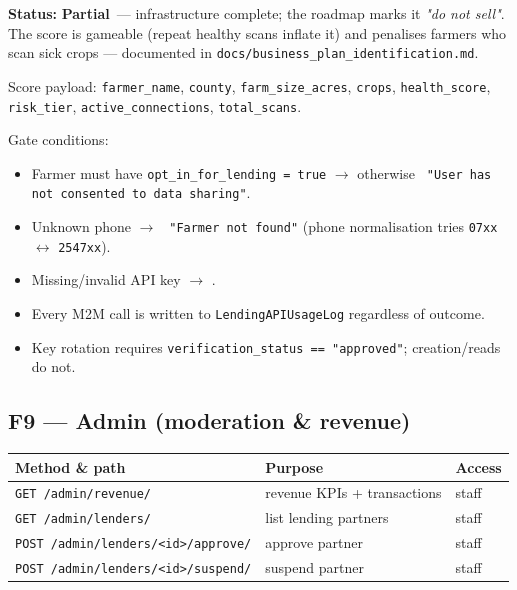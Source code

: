\documentclass[11pt,a4paper]{article}
\newcommand{\partialstatus}{\textcolor{statuspart}{\textbf{Partial}}}
\newcommand{\code}[1]{\texttt{\allowbreak #1\allowbreak}}
\begin{document}
\textbf{Status:} \partialstatus\ --- infrastructure complete; the roadmap
marks it \emph{"do not sell"}. The score is gameable (repeat healthy scans
inflate it) and penalises farmers who scan sick crops --- documented in
\code{docs/business\_plan\_identification.md}.

Score payload: \code{farmer\_name}, \code{county}, \code{farm\_size\_acres},
\code{crops}, \code{health\_score}, \code{risk\_tier},
\code{active\_connections}, \code{total\_scans}.

Gate conditions:
\begin{itemize}
  \item Farmer must have \code{opt\_in\_for\_lending = true} $\rightarrow$
        otherwise \code{403 "User has not consented to data sharing"}.
  \item Unknown phone $\rightarrow$ \code{404 "Farmer not found"}
        (phone normalisation tries \code{07xx} $\leftrightarrow$ \code{2547xx}).
  \item Missing/invalid API key $\rightarrow$ \code{401}.
  \item Every M2M call is written to \code{LendingAPIUsageLog} regardless
        of outcome.
  \item Key rotation requires \code{verification\_status == "approved"};
        creation/reads do not.
\end{itemize}

\subsection{F9 --- Admin (moderation \& revenue)}
\begin{center}
\small
\begin{tabularx}{\textwidth}{@{} l X l @{}}
\toprule
\textbf{Method \& path} & \textbf{Purpose} & \textbf{Access} \\
\midrule
\code{GET /admin/revenue/}            & revenue KPIs + transactions & staff \\
\code{GET /admin/lenders/}            & list lending partners & staff \\
\code{POST /admin/lenders/<id>/approve/}  & approve partner & staff \\
\code{POST /admin/lenders/<id>/suspend/}  & suspend partner & staff \\
\bottomrule
\end{tabularx}
\end{center}
\end{document}
